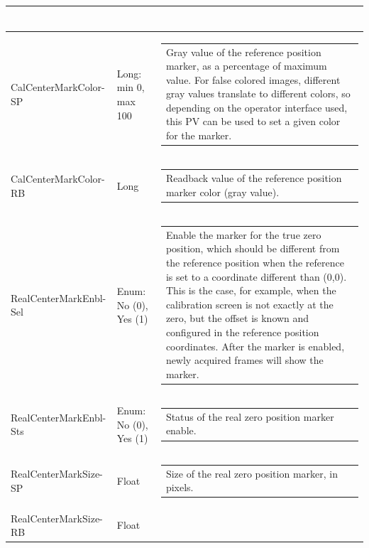\documentclass[openany]{article}
\begin{document}
\begin{longtable}{| m{3.0cm} m{4.5cm}  m{7.0cm} |}
\begin{tabular}{@{}m{6cm}@{}}
            \end{tabular} \hypertarget{pv:cal-center-mark-color}{}\\ \hline
        CalCenterMarkColor-SP & Long: min 0, max 100 & \begin{tabular}{@{}m{6cm}@{}}
                Gray value of the reference position marker, as a percentage of maximum value. For false colored images,
                different gray values translate to different colors, so depending
                on the operator interface used, this PV can be used to set a given
                color for the marker.
            \end{tabular} \\ \hline
        CalCenterMarkColor-RB & Long & \begin{tabular}{@{}m{6cm}@{}}
                Readback value of the reference position marker color (gray value).
            \end{tabular} \hypertarget{pv:real-center-mark-enbl}{}\\ \hline
        RealCenterMarkEnbl-Sel & Enum: No (0), Yes (1) & \begin{tabular}{@{}m{6cm}@{}}
                Enable the marker for the true zero position, which should be different
                from the reference position when the reference is set to a coordinate
                different than (0,0). This is the case, for example, when the calibration
                screen is not exactly at the zero, but the offset is known and configured
                in the reference position coordinates. After the marker is enabled, newly
                acquired frames will show the marker.
            \end{tabular} \\ \hline
        RealCenterMarkEnbl-Sts & Enum: No (0), Yes (1) & \begin{tabular}{@{}m{6cm}@{}}
                Status of the real zero position marker enable.
            \end{tabular} \hypertarget{pv:real-center-mark-size}{}\\ \hline
        RealCenterMarkSize-SP & Float & \begin{tabular}{@{}m{6cm}@{}}
                Size of the real zero position marker, in pixels.
            \end{tabular} \\ \hline
        RealCenterMarkSize-RB & Float & \begin{tabular}{@{}m{6cm}@{}}

\end{tabular}
\end{longtable}
\end{document}
